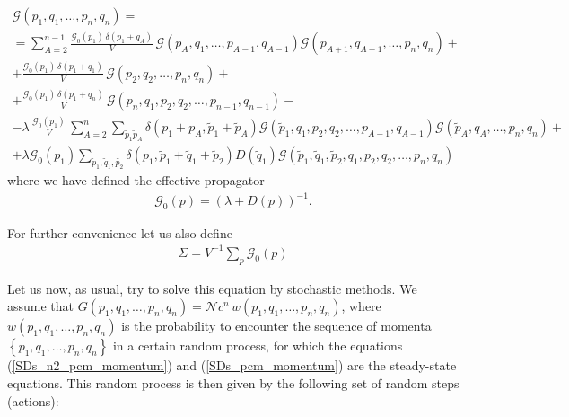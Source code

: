 \documentclass[twocolumn,showpacs,preprintnumbers,superscriptaddress,amsmath,floatfix,amssymb,secnumarabic]{revtex4}
\newcommand{\G}{\mathcal{G}}
\newcommand{\lr}[1]{ \left( #1 \right) }
\newcommand{\lrc}[1]{ \left\{ #1 \right\} }
\begin{document}
\begin{widetext}
\begin{eqnarray}
\label{SDs_pcm_momentum}
 \G\lr{p_1, q_1, \ldots, p_n, q_n}
 = \nonumber \\ =
 \sum\limits_{A=2}^{n-1}
 \frac{\G_0\lr{p_1} \, \delta\lr{p_1 + q_A}}{V} \,
 \G\lr{    p_A,     q_1, \ldots, p_{A-1}, q_{A-1}}
 \G\lr{p_{A+1}, q_{A+1}, \ldots,     p_n,    q_n }
 + \nonumber \\ +
 \frac{\G_0\lr{p_1} \, \delta\lr{p_1 + q_1}}{V} \,
 \G\lr{p_2, q_2, \ldots, p_n, q_n}
 + \nonumber \\ +
 \frac{\G_0\lr{p_1} \, \delta\lr{p_1 + q_n}}{V} \,
 \G\lr{p_n, q_1, p_2, q_2, \ldots, p_{n-1}, q_{n-1}}
 - \nonumber \\ -
 \lambda \, \frac{\G_0\lr{p_1}}{V} \,
 \sum\limits_{A=2}^{n}
 \sum\limits_{\tilde{p}_1 \tilde{p}_A} \delta\lr{p_1 + p_A, \tilde{p}_1 + \tilde{p}_A}
 \G\lr{\tilde{p}_1, q_1, p_2, q_2, \ldots, p_{A-1}, q_{A-1}}
 \G\lr{\tilde{p}_A, q_A,           \ldots, p_n, q_n}
 + \nonumber \\ +
 \lambda \G_0\lr{p_1}
 \sum\limits_{\tilde{p}_1, \tilde{q}_1, \tilde{p_2}}
 \delta\lr{p_1, \tilde{p}_1 + \tilde{q}_1 + \tilde{p}_2} D\lr{\tilde{q}_1}
 \G\lr{\tilde{p}_1, \tilde{q}_1, \tilde{p}_2, q_1, p_2, q_2, \ldots, p_n, q_n}
\end{eqnarray}
where we have defined the effective propagator
\begin{eqnarray}
\label{free_prop_def}
\G_0\lr{p} = \lr{\lambda + D\lr{p}}^{-1} .
\end{eqnarray}
\end{widetext}
For further convenience let us also define
\begin{eqnarray}
\label{prop_norm_def}
\Sigma = V^{-1} \sum\limits_{p} \G_0\lr{p}
\end{eqnarray}

Let us now, as usual, try to solve this equation by stochastic methods. We assume that $G\lr{p_1, q_1, \ldots, p_n, q_n} = \mathcal{N} c^{n} \, w\lr{p_1, q_1, \ldots, p_n, q_n}$, where $w\lr{p_1, q_1, \ldots, p_n, q_n}$ is the probability to encounter the sequence of momenta $\lrc{p_1, q_1, \ldots, p_n, q_n}$ in a certain random process, for which the equations (\ref{SDs_n2_pcm_momentum}) and (\ref{SDs_pcm_momentum}) are the steady-state equations. This random process is then given by the following set of random steps (actions):
\end{document}
